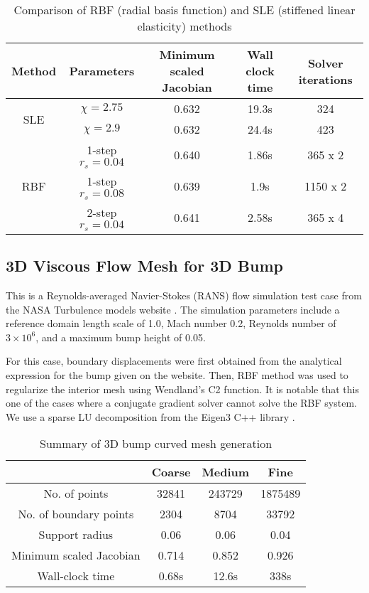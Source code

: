 \begin{table}
\begin{tabular}{|c|c|c|c|c|}
\hline
 Method & Parameters & Minimum scaled Jacobian & Wall clock time & Solver iterations \\
 \hline
\multirow{2}{1in}{SLE} & $\chi=2.75$ & 0.632 & 19.3s & 324 \\
				 & $\chi=2.9$ & 0.632 & 24.4s & 423 \\
\multirow{3}{1in}{RBF} & 1-step $r_s=0.04$ & 0.640 & 1.86s & 365 x 2 \\
				&   1-step $r_s=0.08$ & 0.639 & 1.9s & 1150 x 2\\
				&   2-step $r_s=0.04$ & 0.641 & 2.58s & 365 x 4\\
\hline
\end{tabular}
\caption{Comparison of RBF (radial basis function) and SLE (stiffened linear elasticity) methods}
\label{tab:rbfelast}
\end{table}
 
\FloatBarrier

\subsection{3D Viscous Flow Mesh for 3D Bump}
This is a Reynolds-averaged Navier-Stokes (RANS) flow simulation test case from the NASA Turbulence models website \cite{case:bump3d}. The simulation parameters include a reference domain length scale of 1.0, Mach number 0.2, Reynolds number of $3\times 10^6$, and a  maximum bump height of 0.05.

For this case, boundary displacements were first obtained from the analytical expression for the bump given on the website. Then, RBF method was used to regularize the interior mesh using Wendland's C2 function. It is notable that this one of the cases where a conjugate gradient solver cannot solve the RBF system. We use a sparse LU decomposition from the Eigen3 C++ library \cite{eigenweb}.

\begin{table}[!h]
\centering
\begin{tabular}{|c|c|c|c|}
	\hline
	  & Coarse & Medium & Fine \\
	 \hline
	 No. of points 				& 32841 & 243729	& 1875489 \\
	 No. of boundary points		& 2304	& 8704		& 33792 \\
	 Support radius				& 0.06	& 0.06		& 0.04 \\
	 Minimum scaled Jacobian	& 0.714	& 0.852		& 0.926 \\
	 Wall-clock time			& 0.68s	& 12.6s		& 338s \\
	 \hline
\end{tabular}
\caption{Summary of 3D bump curved mesh generation}
\end{table}

